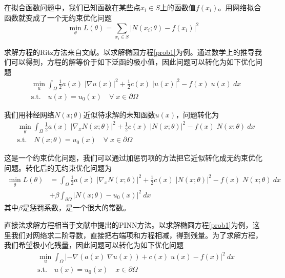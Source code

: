 
在拟合函数问题中，我们已知函数在某些点$x_i \in S$上的函数值$f(x_i)$。用网络拟合函数就变成了一个无约束优化问题
\begin{equation}
\min_{\theta} L(\theta) = \sum_{x_i \in S} |N(x_i; \theta) - f(x_i)|^2
\end{equation}


求解方程的Ritz方法来自文献\cite{weinan2018deep, liao2019deep}。以求解椭圆方程\eqref{prob1}为例。通过数学上的推导我们可以得到，方程的解等价于如下泛函的极小值，因此问题可以转化为如下优化问题
\begin{equation}
\begin{split}
& \min_{u} \int_{\Omega} \frac{1}{2} a(x) \; |\nabla u(x)|^2 + \frac{1}{2} c(x) \; |u(x)|^2 - f(x) \; u(x) \ dx \\
& \text{s.t.} \quad u(x) = u_0(x) \quad \forall \; x \in \partial \Omega
\end{split}
\end{equation}

我们用神经网络$N(x; \theta)$近似待求解的未知函数$u(x)$，问题转化为
\begin{equation}
\begin{split}
& \min_{\theta} \int_{\Omega} \frac{1}{2} a(x) \; |\nabla_x N(x; \theta)|^2 + \frac{1}{2} c(x) \; |N(x; \theta)|^2 - f(x) \; N(x; \theta) \ dx \\
& \text{s.t.} \quad N(x; \theta) = u_0(x) \quad \forall \; x \in \partial \Omega
\end{split}
\end{equation}

这是一个约束优化问题，我们可以通过加惩罚项的方法把它近似转化成无约束优化问题。转化后的无约束优化问题为
\begin{equation}
\begin{split}
\min_{\theta} L(\theta) & = \int_{\Omega} \frac{1}{2} a(x) \; |\nabla_x N(x; \theta)|^2 + \frac{1}{2} c(x) \; |N(x; \theta)|^2 - f(x) \; N(x; \theta) \ dx \\
& + \beta \int_{\partial \Omega} |N(x; \theta) - u_0(x)|^2 \ dx
\end{split}
\end{equation}
其中$\beta$是惩罚系数，是一个很大的常数。


直接法求解方程相当于文献\cite{raissi2019physics}中提出的PINN方法。以求解椭圆方程\eqref{prob1}为例，这里我们对网络求二阶导数，直接把右端项和方程相减，得到残量。为了求解方程，我们希望极小化残量，因此问题可以转化为如下优化问题
\begin{equation}
\begin{split}
& \min_{u} \int_{\Omega} |-\nabla(a(x) \; \nabla u(x)) + c(x) \; u(x) - f(x)|^2 \ dx \\
& \text{s.t.} \quad u(x) = u_0(x) \quad x \in \partial \Omega
\end{split}
\end{equation}

